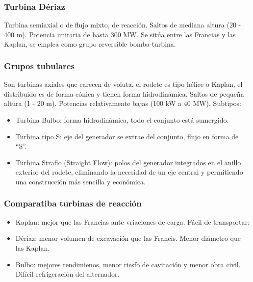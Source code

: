 \subsubsection{Turbina Dériaz}
Turbina semiaxial o de flujo mixto, de reacción. Saltos de mediana altura (20 - 400 m). Potencia unitaria de hasta 300 MW. Se sitúa entre las Francias y las Kaplan, se emplea como grupo reversible bomba-turbina.

\subsubsection{Grupos tubulares}
Son turbinas axiales que carecen de voluta, el rodete es tipo hélice o Kaplan, el distribuido es de forma cónica y tienen forma hidrodinámica. Saltos de pequeña altura (1 - 20 m). Potencias relativamente bajas (100 kW a 40 MW). Subtipos:
\begin{itemize}
    \item Turbina Bulbo: forma hidrodinámica, todo el conjunto está sumergido.
    \item Turbina tipo S: eje del generador se extrae del conjunto, flujo en forma de ``S''.
    \item Turbina Straflo (Straight Flow): polos del generador integrados en el anillo exterior del rodete, eliminando la necesidad de un eje central y permitiendo una construcción más sencilla y económica.
\end{itemize}

\subsubsection{Comparatiba turbinas de reacción}
\begin{itemize}
    \item Kaplan: mejor que las Francias ante vriaciones de carga. Fácil de transportar:
    \item Dériaz: menor volumen de excavación que las Francis. Menor diámetro que las Kaplan.
    \item Bulbo: mejores rendimienos, menor riesfo de cavitación y menor obra civil. Difícil refrigeración del alternador.
\end{itemize}

\begin{table}[H]
    \centering
\end{table}

